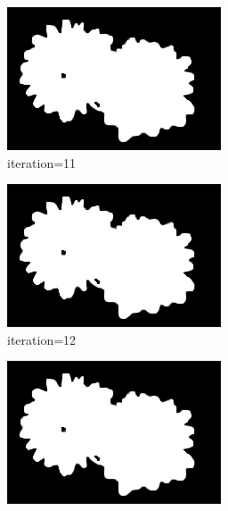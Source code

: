 \documentclass{article}
\begin{document}
\begin{figure}[t]
\begin{subfigure}[t]{0.19\textwidth}
\includegraphics[width=\textwidth]{./images/marginals_iter_11.png}
\vspace{-0.6cm}
\caption{iteration=11}
\end{subfigure}
\begin{subfigure}[t]{0.19\textwidth}
\centering
\includegraphics[width=\textwidth]{./images/marginals_iter_12.png}
\vspace{-0.6cm}
\caption{iteration=12}
\end{subfigure}
\begin{subfigure}[t]{0.19\textwidth}
\centering
\includegraphics[width=\textwidth]{./images/marginals_iter_13.png}

\end{subfigure}
\end{figure}
\end{document}
